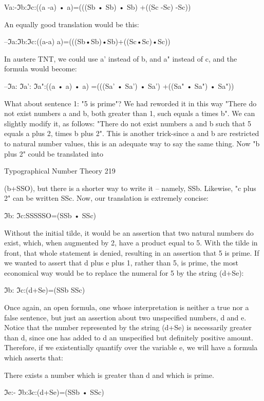                 Va:-ℑb:ℑc:((a -a) • a)=(((Sb • Sb) • Sb) +((Sc -Sc) -Sc))

An equally good translation would be this:

                   --ℑa:ℑb:ℑc:((a-a) a)=(((Sb•Sb)•Sb)+((Sc•Sc)•Sc))

In austere TNT, we could use a' instead of b, and a" instead of c, and the formula would
become:

         --ℑa: ℑa': ℑa":((a • a) • a) =(((Sa' • Sa') • Sa') +((Sa" • Sa") • Sa"))

What about sentence 1: "5 is prime"? We had reworded it in this way "There do not exist
numbers a and b, both greater than 1, such equals a times b". We can slightly modify it,
as follows: "There do not exist numbers a and b such that 5 equals a plus 2, times b plus
2". This is another trick-since a and b are restricted to natural number values, this is an
adequate way to say the same thing. Now "b plus 2" could be translated into


Typographical Number Theory                                                             219

(b+SSO), but there is a shorter way to write it -- namely, SSb. Likewise, "c plus 2" can
be written SSc. Now, our translation is extremely concise:

                               ℑb: ℑc:SSSSSO=(SSb • SSc)

Without the initial tilde, it would be an assertion that two natural numbers do exist,
which, when augmented by 2, have a product equal to 5. With the tilde in front, that
whole statement is denied, resulting in an assertion that 5 is prime.
       If we wanted to assert that d plus e plus 1, rather than 5, is prime, the most
economical way would be to replace the numeral for 5 by the string (d+Se):

                                ℑb: ℑc:(d+Se)=(SSb SSc)

Once again, an open formula, one whose interpretation is neither a true nor a false
sentence, but just an assertion about two unspecified numbers, d and e. Notice that the
number represented by the string (d+Se) is necessarily greater than d, since one has
added to d an unspecified but definitely positive amount. Therefore, if we existentially
quantify over the variable e, we will have a formula which asserts that:

There exists a number which is greater than d and which is prime.

                             ℑe:- ℑb:3c:(d+Se)=(SSb • SSc)

